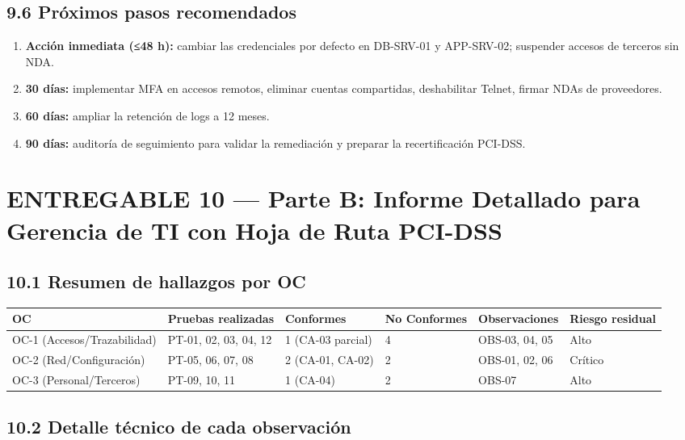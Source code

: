 \documentclass[11pt,a4paper]{article}
\begin{document}
\subsection{9.6 Próximos pasos recomendados}

\begin{enumerate}[leftmargin=*]
  \item \textbf{Acción inmediata (≤48 h):} cambiar las credenciales por defecto en DB-SRV-01 y APP-SRV-02; suspender accesos de terceros sin NDA.
  \item \textbf{30 días:} implementar MFA en accesos remotos, eliminar cuentas compartidas, deshabilitar Telnet, firmar NDAs de proveedores.
  \item \textbf{60 días:} ampliar la retención de logs a 12 meses.
  \item \textbf{90 días:} auditoría de seguimiento para validar la remediación y preparar la recertificación PCI-DSS.
\end{enumerate}

\clearpage

\section{ENTREGABLE 10 — Parte B: Informe Detallado para Gerencia de TI con Hoja de Ruta PCI-DSS}

\subsection{10.1 Resumen de hallazgos por OC}

\begin{tabularx}{\textwidth}{P{1.8cm}P{2cm}P{3cm}P{2cm}P{1.5cm}L}
\toprule
\textbf{OC} & \textbf{Pruebas realizadas} & \textbf{Conformes} & \textbf{No Conformes} & \textbf{Observaciones} & \textbf{Riesgo residual} \\
\midrule
OC-1 (Accesos/Trazabilidad) & PT-01, 02, 03, 04, 12 & 1 (CA-03 parcial) & 4 & OBS-03, 04, 05 & Alto \\
OC-2 (Red/Configuración) & PT-05, 06, 07, 08 & 2 (CA-01, CA-02) & 2 & OBS-01, 02, 06 & Crítico \\
OC-3 (Personal/Terceros) & PT-09, 10, 11 & 1 (CA-04) & 2 & OBS-07 & Alto \\
\bottomrule
\end{tabularx}

\subsection{10.2 Detalle técnico de cada observación}
\end{document}
